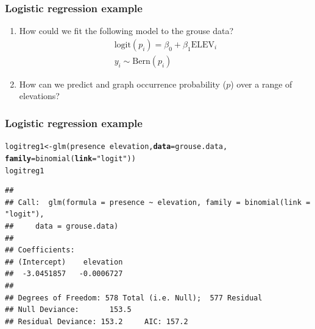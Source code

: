 \documentclass[color=usenames,dvipsnames]{beamer}\usepackage[]{graphicx}\usepackage[]{xcolor}
\makeatletter
\newcommand{\hlsng}[1]{\textcolor[rgb]{0.749,0.012,0.012}{#1}}%
\newcommand{\hlopt}[1]{\textcolor[rgb]{0,0,0}{#1}}%
\newcommand{\hldef}[1]{\textcolor[rgb]{0,0,0}{#1}}%
\newcommand{\hlkwb}[1]{\textcolor[rgb]{0,0.341,0.682}{#1}}%
\newcommand{\hlkwc}[1]{\textcolor[rgb]{0,0,0}{\textbf{#1}}}%
\newcommand{\hlkwd}[1]{\textcolor[rgb]{0.004,0.004,0.506}{#1}}%
\newenvironment{kframe}{%
 \def\at@end@of@kframe{}%
 \ifinner\ifhmode%
  \def\at@end@of@kframe{\end{minipage}}%
  \begin{minipage}{\columnwidth}%
 \fi\fi%
 \def\FrameCommand##1{\hskip\@totalleftmargin \hskip-\fboxsep
 \colorbox{shadecolor}{##1}\hskip-\fboxsep
     \hskip-\linewidth \hskip-\@totalleftmargin \hskip\columnwidth}%
 \MakeFramed {\advance\hsize-\width
   \@totalleftmargin\z@ \linewidth\hsize
   \@setminipage}}%
 {\par\unskip\endMakeFramed%
 \at@end@of@kframe}
\newenvironment{knitrout}{}{} %
\makeatother
\begin{document}




\begin{frame}
  \frametitle{Logistic regression example}
  \begin{enumerate}
  \item How could we fit the following model to the grouse data?
    \begin{gather*}
      \mathrm{logit}(p_i) = \beta_0 + \beta_1\mathrm{ELEV}_i \\
      y_i \sim \mathrm{Bern}(p_i)
    \end{gather*}
  \item How can we predict and graph occurrence probability ($p$) over a range of
    elevations?
  \end{enumerate}
\end{frame}



\begin{frame}[fragile]
\frametitle{Logistic regression example}
\begin{knitrout}\scriptsize
{}\color{fgcolor}\begin{kframe}
\begin{alltt}
\hldef{logitreg1} \hlkwb{<-} \hlkwd{glm}\hldef{(presence} \hlopt{~} \hldef{elevation,} \hlkwc{data}\hldef{=grouse.data,}
                 \hlkwc{family}\hldef{=}\hlkwd{binomial}\hldef{(}\hlkwc{link}\hldef{=}\hlsng{"logit"}\hldef{))}
\hldef{logitreg1}
\end{alltt}
\begin{verbatim}
## 
## Call:  glm(formula = presence ~ elevation, family = binomial(link = "logit"), 
##     data = grouse.data)
## 
## Coefficients:
## (Intercept)    elevation  
##  -3.0451857   -0.0006727  
## 
## Degrees of Freedom: 578 Total (i.e. Null);  577 Residual
## Null Deviance:	    153.5 
## Residual Deviance: 153.2 	AIC: 157.2
\end{verbatim}
\end{kframe}
\end{knitrout}
\end{frame}
\end{document}
